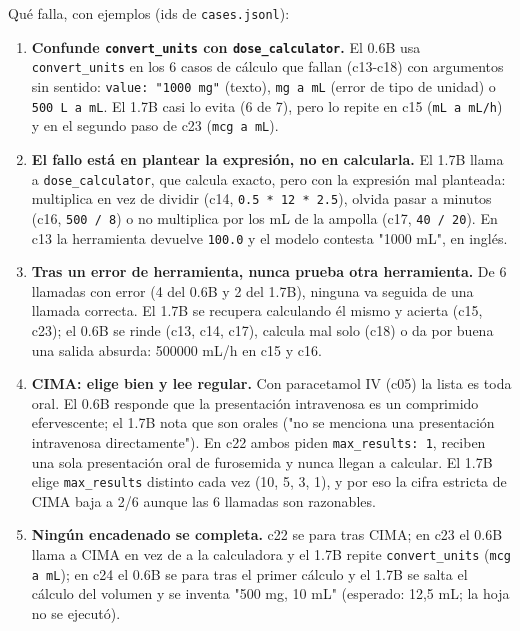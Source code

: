 Qué falla, con ejemplos (ids de \texttt{cases.jsonl}):

\begin{enumerate}
\tightlist
\item
  \textbf{Confunde \texttt{convert\_\allowbreak{}units} con \texttt{dose\_\allowbreak{}calculator}.} El 0.6B usa \texttt{convert\_\allowbreak{}units} en los 6 casos
  de cálculo que fallan (c13-c18) con argumentos sin sentido: \texttt{value: "1000 mg"} (texto),
  \texttt{mg a mL} (error de tipo de unidad) o \texttt{500 L a mL}. El 1.7B casi lo evita (6 de 7), pero lo
  repite en c15 (\texttt{mL a mL/\allowbreak{}h}) y en el segundo paso de c23 (\texttt{mcg a mL}).
\item
  \textbf{El fallo está en plantear la expresión, no en calcularla.} El 1.7B llama a
  \texttt{dose\_\allowbreak{}calculator}, que calcula exacto, pero con la expresión mal planteada: multiplica en vez
  de dividir (c14, \texttt{0.5 * 12 * 2.5}), olvida pasar a minutos (c16, \texttt{500 /\allowbreak{} 8}) o no multiplica por
  los mL de la ampolla (c17, \texttt{40 /\allowbreak{} 20}). En c13 la herramienta devuelve \texttt{100.0} y el modelo
  contesta "1000 mL", en inglés.
\item
  \textbf{Tras un error de herramienta, nunca prueba otra herramienta.} De 6 llamadas con error
  (4 del 0.6B y 2 del 1.7B), ninguna va seguida de una llamada correcta. El 1.7B se recupera
  calculando él mismo y acierta (c15, c23); el 0.6B se rinde (c13, c14, c17), calcula mal solo
  (c18) o da por buena una salida absurda: 500000 mL/h en c15 y c16.
\item
  \textbf{CIMA: elige bien y lee regular.} Con paracetamol IV (c05) la lista es toda oral. El 0.6B
  responde que la presentación intravenosa es un comprimido efervescente; el 1.7B nota que son
  orales ("no se menciona una presentación intravenosa directamente"). En c22 ambos piden
  \texttt{max\_\allowbreak{}results: 1}, reciben una sola presentación oral de furosemida y nunca llegan a calcular.
  El 1.7B elige \texttt{max\_\allowbreak{}results} distinto cada vez (10, 5, 3, 1), y por eso la cifra estricta de
  CIMA baja a 2/6 aunque las 6 llamadas son razonables.
\item
  \textbf{Ningún encadenado se completa.} c22 se para tras CIMA; en c23 el 0.6B llama a CIMA en vez de
  a la calculadora y el 1.7B repite \texttt{convert\_\allowbreak{}units} (\texttt{mcg a mL}); en c24 el 0.6B se para tras el
  primer cálculo y el 1.7B se salta el cálculo del volumen y se inventa "500 mg, 10 mL" (esperado:
  12,5 mL; la hoja no se ejecutó).

\end{enumerate}
